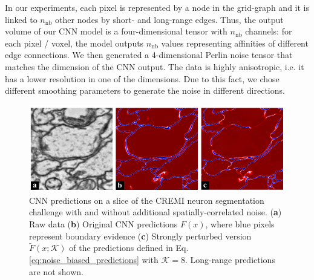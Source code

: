 In our experiments, each pixel is represented by a node in the grid-graph and it is linked to $n_{\mathrm{nb}}$ other nodes by short- and long-range edges. Thus, the output volume of our CNN model is a four-dimensional tensor with $n_{\mathrm{nb}}$ channels: for each pixel / voxel, the model outputs $n_{\mathrm{nb}}$ values representing affinities of different edge connections. We then generated a 4-dimensional Perlin noise tensor that matches the dimension of the CNN output. The data is highly anisotropic, i.e. it has a lower resolution in one of the dimensions. Due to this fact, we chose different smoothing parameters to generate the noise in different directions. 

\begin{figure}[t]
\centering
        \includegraphics[width=\textwidth,trim=0.0in -0.in -0.0in -0.4in,clip]{figs/noisy_affs_comparison_v2.pdf}
    \caption{CNN predictions on a slice of the CREMI neuron segmentation challenge with and without additional spatially-correlated noise. (\textbf{a}) Raw data (\textbf{b}) Original CNN predictions $F(x)$, where blue pixels represent boundary evidence (\textbf{c}) Strongly perturbed version $\tilde{F}(x;\mathcal{K})$ of the predictions defined in Eq. \ref{eq:noise_biased_predictions} with $\mathcal{K}=8$. Long-range predictions are not shown. 
    }
    \label{fig:noisy_affs}
\end{figure}
